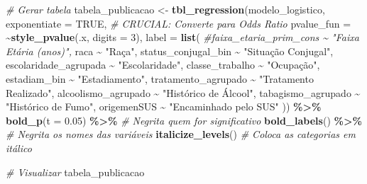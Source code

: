 \documentclass[
]{article}
\newenvironment{Shaded}{\begin{snugshade}}{\end{snugshade}}
\newcommand{\AttributeTok}[1]{\textcolor[rgb]{0.13,0.29,0.53}{#1}}
\newcommand{\CommentTok}[1]{\textcolor[rgb]{0.56,0.35,0.01}{\textit{#1}}}
\newcommand{\ConstantTok}[1]{\textcolor[rgb]{0.56,0.35,0.01}{#1}}
\newcommand{\DecValTok}[1]{\textcolor[rgb]{0.00,0.00,0.81}{#1}}
\newcommand{\FloatTok}[1]{\textcolor[rgb]{0.00,0.00,0.81}{#1}}
\newcommand{\FunctionTok}[1]{\textcolor[rgb]{0.13,0.29,0.53}{\textbf{#1}}}
\newcommand{\NormalTok}[1]{#1}
\newcommand{\OtherTok}[1]{\textcolor[rgb]{0.56,0.35,0.01}{#1}}
\newcommand{\SpecialCharTok}[1]{\textcolor[rgb]{0.81,0.36,0.00}{\textbf{#1}}}
\newcommand{\StringTok}[1]{\textcolor[rgb]{0.31,0.60,0.02}{#1}}
\begin{document}
\begin{Shaded}
\begin{Highlighting}[]
\CommentTok{\# Gerar tabela}
\NormalTok{tabela\_publicacao }\OtherTok{\textless{}{-}} \FunctionTok{tbl\_regression}\NormalTok{(modelo\_logistico, }
                                    \AttributeTok{exponentiate =} \ConstantTok{TRUE}\NormalTok{, }\CommentTok{\# CRUCIAL: Converte para Odds Ratio}
                                    \AttributeTok{pvalue\_fun =} \SpecialCharTok{\textasciitilde{}}\FunctionTok{style\_pvalue}\NormalTok{(.x, }\AttributeTok{digits =} \DecValTok{3}\NormalTok{),}
                                    \AttributeTok{label =} \FunctionTok{list}\NormalTok{(}
                                      \CommentTok{\#faixa\_etaria\_prim\_cons \textasciitilde{} "Faixa Etária (anos)",}
\NormalTok{                                      raca }\SpecialCharTok{\textasciitilde{}} \StringTok{"Raça"}\NormalTok{,}
\NormalTok{                                      status\_conjugal\_bin }\SpecialCharTok{\textasciitilde{}} \StringTok{"Situação Conjugal"}\NormalTok{,}
\NormalTok{                                      escolaridade\_agrupada }\SpecialCharTok{\textasciitilde{}} \StringTok{"Escolaridade"}\NormalTok{,}
\NormalTok{                                      classe\_trabalho }\SpecialCharTok{\textasciitilde{}} \StringTok{"Ocupação"}\NormalTok{,}
\NormalTok{                                      estadiam\_bin }\SpecialCharTok{\textasciitilde{}} \StringTok{"Estadiamento"}\NormalTok{,}
\NormalTok{                                      tratamento\_agrupado }\SpecialCharTok{\textasciitilde{}} \StringTok{"Tratamento Realizado"}\NormalTok{,}
\NormalTok{                                      alcoolismo\_agrupado }\SpecialCharTok{\textasciitilde{}} \StringTok{"Histórico de Álcool"}\NormalTok{,}
\NormalTok{                                      tabagismo\_agrupado }\SpecialCharTok{\textasciitilde{}} \StringTok{"Histórico de Fumo"}\NormalTok{,}
\NormalTok{                                      origemenSUS }\SpecialCharTok{\textasciitilde{}} \StringTok{"Encaminhado pelo SUS"}
\NormalTok{                                    )) }\SpecialCharTok{\%\textgreater{}\%}
  \FunctionTok{bold\_p}\NormalTok{(}\AttributeTok{t =} \FloatTok{0.05}\NormalTok{) }\SpecialCharTok{\%\textgreater{}\%} \CommentTok{\# Negrita quem for significativo}
  \FunctionTok{bold\_labels}\NormalTok{() }\SpecialCharTok{\%\textgreater{}\%}    \CommentTok{\# Negrita os nomes das variáveis}
  \FunctionTok{italicize\_levels}\NormalTok{()   }\CommentTok{\# Coloca as categorias em itálico}

\CommentTok{\# Visualizar}
\NormalTok{tabela\_publicacao}
\end{Highlighting}
\end{Shaded}
\end{document}
